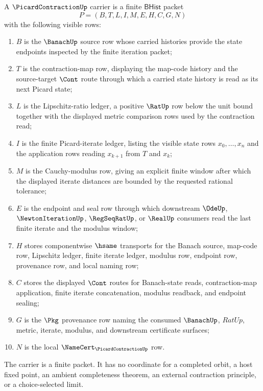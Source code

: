 \begin{definition}
\label{def:picardcontraction-bhist-carrier}
A $\PicardContractionUp$ carrier is a finite $\mathsf{BHist}$ packet
$$
P=(B,T,L,I,M,E,H,C,G,N)
$$
with the following visible rows:
\begin{enumerate}
\item $B$ is the $\BanachUp$ source row whose carried histories provide the
state endpoints inspected by the finite iteration packet;
\item $T$ is the contraction-map row, displaying the map-code history and the
source-target $\Cont$ route through which a carried state history is read as
its next Picard state;
\item $L$ is the Lipschitz-ratio ledger, a positive $\RatUp$ row below the
unit bound together with the displayed metric comparison rows used by the
contraction read;
\item $I$ is the finite Picard-iterate ledger, listing the visible state rows
$x_0,\ldots,x_n$ and the application rows reading $x_{k+1}$ from $T$ and
$x_k$;
\item $M$ is the Cauchy-modulus row, giving an explicit finite window after
which the displayed iterate distances are bounded by the requested rational
tolerance;
\item $E$ is the endpoint and seal row through which downstream $\OdeUp$,
$\NewtonIterationUp$, $\RegSeqRatUp$, or $\RealUp$ consumers read the last
finite iterate and the modulus window;
\item $H$ stores componentwise $\hsame$ transports for the Banach source,
map-code row, Lipschitz ledger, finite iterate ledger, modulus row, endpoint
row, provenance row, and local naming row;
\item $C$ stores the displayed $\Cont$ routes for Banach-state reads,
contraction-map application, finite iterate concatenation, modulus readback,
and endpoint sealing;
\item $G$ is the $\Pkg$ provenance row naming the consumed $\BanachUp$,
$RatUp$, metric, iterate, modulus, and downstream certificate surfaces;
\item $N$ is the local $\NameCert_{\PicardContractionUp}$ row.
\end{enumerate}
The carrier is a finite packet. It has no coordinate for a completed orbit, a
host fixed point, an ambient completeness theorem, an external contraction
principle, or a choice-selected limit.
\end{definition}

